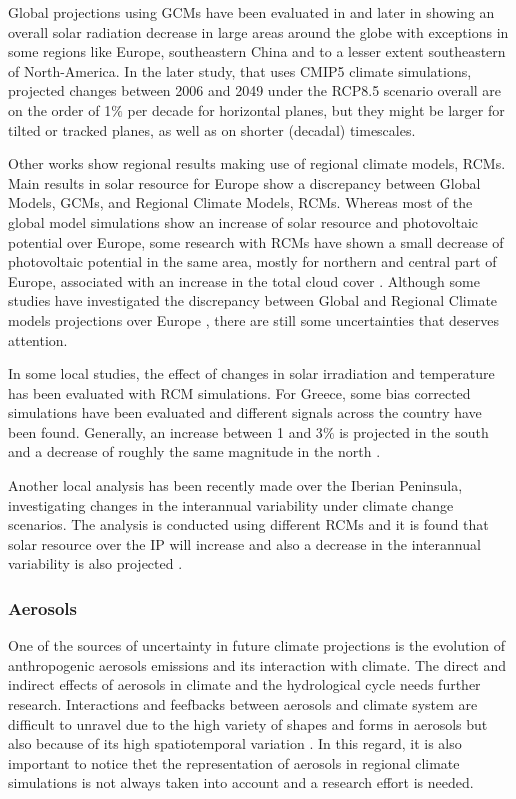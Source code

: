 Global projections using GCMs have been evaluated in \cite*{Crook2011} and later in \cite*{Wild2012} showing an overall solar radiation decrease in large areas around the globe with exceptions in some regions like Europe, southeastern China and to a lesser extent southeastern of North-America. In the later study, that uses CMIP5 climate simulations, projected changes between 2006 and 2049 under the RCP8.5 scenario overall are on the order of 1$\%$ per decade for horizontal planes, but they might be larger for tilted or tracked planes, as well as on shorter (decadal) timescales.  

Other works show regional results making use of regional climate models, RCMs. Main results in solar resource for Europe show a discrepancy between Global Models, GCMs, and Regional Climate Models, RCMs. Whereas most of the global model simulations show an increase of solar resource and photovoltaic potential over Europe, some research with RCMs have shown a small decrease of photovoltaic potential in the same area, mostly for northern and central part of Europe, associated with an increase in the total cloud cover \cite*{Jerez2015}. Although some studies have investigated the discrepancy between Global and Regional Climate models projections over Europe \cite*{Bartok2017}, there are still some uncertainties that deserves attention.

In some local studies, the effect of changes in solar irradiation and temperature has been evaluated with RCM simulations. For Greece, some bias corrected simulations have been evaluated and different signals across the country have been found. Generally, an increase between 1 and 3$\%$ is projected in the south and a decrease of roughly the same magnitude in the north \cite*{panagea2014}. 

Another local analysis has been recently made over the Iberian Peninsula, investigating changes in the interannual variability under climate change scenarios. The analysis is conducted using different RCMs and it is found that solar resource over the IP will increase and also a decrease in the interannual variability is also projected \cite*{Gil2019}.

\subsubsection{Aerosols}

One of the sources of uncertainty in future climate projections is the evolution of anthropogenic aerosols emissions and its interaction with climate. The direct and indirect effects of aerosols in climate and the hydrological cycle needs further research. Interactions and feefbacks between aerosols and climate system are difficult to unravel due to the high variety of shapes and forms in aerosols but also because of its high spatiotemporal variation \cite*{Kaufman2002}. In this regard, it is also important to notice thet the representation of aerosols in regional climate simulations is not always taken into account and a research effort is needed.  
 
